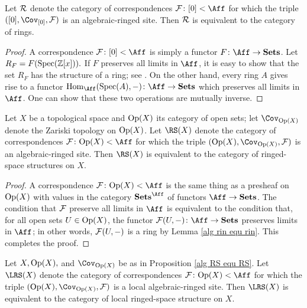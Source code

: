 \documentclass[10pt]{amsart}
\begin{document}
\begin{lemma}\label{alg rin equ rin}

Let $\mathcal{R}$ denote the category of correspondences $\mcF\taking[0]<\Aff$ for which the triple $([0],\Cov_{[0]},\mcF)$ is an algebraic-ringed site.  Then $\mathcal{R}$ is equivalent to the category of rings.

\end{lemma}

\begin{proof}

A correspondence $\mcF\taking[0]<\Aff$ is simply a functor $F\taking\Aff\to\Sets$.  Let $R_F=F(\textnormal{Spec}({\mathbb Z}[x])).$  If $F$ preserves all limits in $\Aff$, it is easy to show that the set $R_F$ has the structure of a ring; see \cite[]{Spi}.  On the other hand, every ring $A$ gives rise to a functor $\Hom_\Aff(\Spec(A),-)\taking\Aff\to\Sets$ which preserves all limits in $\Aff$.  One can show that these two operations are mutually inverse.

\end{proof}

\begin{proposition}\label{alg RS equ RS}

Let $X$ be a topological space and $\textnormal{Op}(X)$ its category of open sets; let $\Cov_{\Op(X)}$ denote the Zariski topology on $\textnormal{Op}(X)$.  Let $\RS(X)$ denote the category of correspondences $\mcF\taking\Op(X)<\Aff$ for which the triple $(\Op(X),\Cov_{\Op(X)},\mcF)$ is an algebraic-ringed site.  Then $\RS(X)$ is equivalent to the category of ringed-space structures on $X$.

\end{proposition}

\begin{proof}

A correspondence $\mcF\taking\Op(X)<\Aff$ is the same thing as a presheaf on $\textnormal{Op}(X)$ with values in the category $\Sets^\Aff$ of functors $\Aff\to\Sets$.  The condition that $\mathcal{F}$ preserve all limits in $\Aff$ is equivalent to the condition that, for all open sets $U\in\textnormal{Op}(X)$, the functor $\mcF(U,-)\taking\Aff\to\Sets$ preserves limits in $\Aff$; in other words, $\mathcal{F}(U,-)$ is a ring by Lemma \ref{alg rin equ rin}.  This completes the proof.

\end{proof}

\begin{proposition}

Let $X, \textnormal{Op}(X),$ and $\Cov_{\Op(X)}$ be as in Proposition \ref{alg RS equ RS}.  Let $\LRS(X)$ denote the category of correspondences $\mcF\taking\Op(X)<\Aff$ for which the triple $(\Op(X),\Cov_{\Op(X)},\mcF)$ is a local algebraic-ringed site.  Then $\LRS(X)$ is equivalent to the category of local ringed-space structure on $X$.

\end{proposition}
\end{document}
